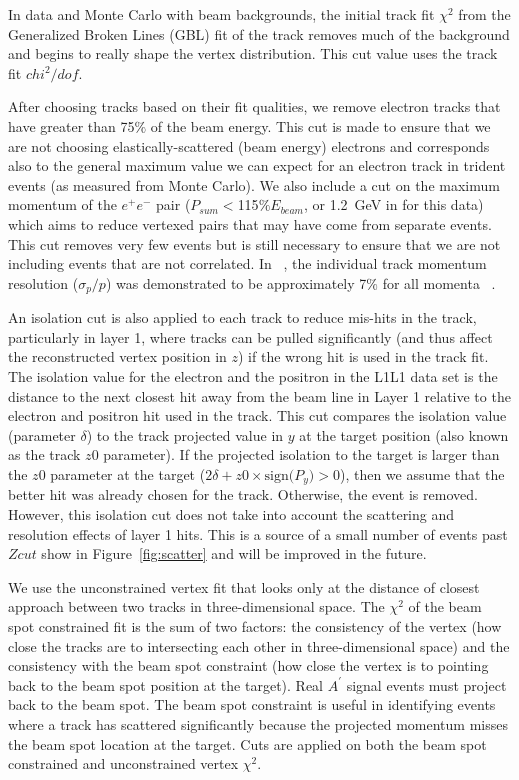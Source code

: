 \documentclass[twocolumn, showpacs, preprintnumbers,prd, superscriptaddress]{revtex4-1}
\begin{document}
In data and Monte Carlo with beam backgrounds, the initial track fit $\chi^{2}$ from the Generalized Broken Lines (GBL) fit of the track removes much of the background and begins to really shape the vertex distribution. This cut value uses the track fit $chi^2/dof$.

After choosing tracks based on their fit qualities, we remove electron tracks that have greater than 75$\%$ of the beam energy. This cut is made to ensure that we are not choosing elastically-scattered (beam energy) electrons and corresponds also to the general maximum value we can expect for an electron track in trident events (as measured from Monte Carlo). We also include a cut on the maximum momentum of the $e^+e^-$ pair ($P_{sum}<$115$\% E_{beam}$, or 1.2~GeV in for this data) which aims to reduce vertexed pairs that may have come from separate events. This cut removes very few events but is still necessary to ensure that we are not including events that are not correlated. In ~\cite{ref:holly_thesis}, the individual track momentum resolution ($\sigma_p / p$) was demonstrated to be approximately 7$\%$ for all momenta ~\cite{ref:thisneedsasource}. 

An isolation cut is also applied to each track to reduce mis-hits in the track, particularly in layer 1, where tracks can be pulled significantly (and thus affect the reconstructed vertex position in $z$) if the wrong hit is used in the track fit. The isolation value for the electron and the positron in the L1L1 data set is the distance to the next closest hit away from the beam line in Layer 1 relative to the electron and positron hit used in the track. This cut compares the isolation value (parameter $\delta$) to the track projected value in $y$ at the target position (also known as the track $z0$ parameter). If the projected isolation to the target is larger than the $z0$ parameter at the target ($2\delta+z0\times\textrm{sign($P_y$)}>0$), then we assume that the better hit was already chosen for the track. Otherwise, the event is removed. However, this isolation cut does not take into account the scattering and resolution effects of layer 1 hits. This is a source of a small number of events past $Zcut$ show in Figure~\ref{fig:scatter} and will be improved in the future.

We use the unconstrained vertex fit that looks only at the distance of closest approach between two tracks in three-dimensional space. The $\chi^2$ of the beam spot constrained fit is the sum of two factors: the consistency of the vertex (how close the tracks are to intersecting each other in three-dimensional space) and the consistency with the beam spot constraint (how close the vertex is to pointing back to the beam spot position at the target). Real $A^{\prime}$ signal events must project back to the beam spot. The beam spot constraint is useful in identifying events where a track has scattered significantly because the projected momentum misses the beam spot location at the target. Cuts are applied on both the beam spot constrained and unconstrained vertex $\chi^2$. 
\end{document}
